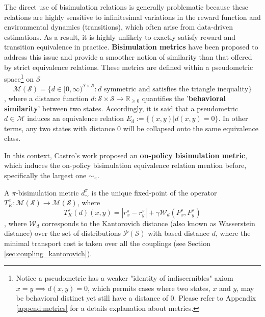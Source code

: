 The direct use of bisimulation relations is generally problematic because these relations are highly sensitive to infinitesimal variations in the reward function and environmental dynamics (transitions), which often arise from data-driven estimations. As a result, it is highly unlikely to exactly satisfy reward and transition equivalence in practice. \textbf{Bisimulation metrics} \cite{ferns2004metrics, ferns2011bisimulation, ferns2014bisimulation, castro2020scalable} have been proposed to address this issue and provide a smoother notion of similarity than that offered by strict equivalence relations. These metrics are defined within a pseudometric space\footnote{Notice a pseudometric has a weaker "identity of indiscernibles" axiom $x = y \implies d(x,y) = 0$, which permits cases where two states, $x$ and $y$, may be behavioral distinct yet still have a distance of 0. Please refer to Appendix \ref{append:metrics} for a details explanation about metrics.} on $\mathcal{S}$ 
\begin{equation}
\mathcal{M(S)}= \{d \in [0, \infty)^{\mathcal{S} \times \mathcal{S}} : d \text{ symmetric and satisfies the triangle inequality}\}
\end{equation}
, where a distance function \(d : \mathcal{S} \times \mathcal{S} \rightarrow \mathbb{R}_{\geq 0}\) quantifies the '\textbf{behavioral similarity}' between two states. Accordingly, it is said that a pseudometric $d \in \mathcal{M}$ induces an equivalence relation $E_d := \{(x, y)|d(x, y) = 0\}$. In other terms, any two states with distance 0 will be collapsed onto the same equivalence class.

In this context, Castro's work \cite{castro2020scalable} proposed an \textbf{on-policy bisimulation metric}, which induces the on-policy bisimulation equivalence relation mention before, specifically the largest one $\sim_\pi$.

\begin{definition}
\label{def:on_policy_bisimulation_metric}
A $\pi$-bisimulation metric $d^\pi_\sim$ is the unique fixed-point of the operator $T^\pi_K : \mathcal{M(S)} \rightarrow \mathcal{M(S)}$, where 
\begin{equation}
    \label{eq:on_policy_bisim_metric}
    T^\pi_K(d)(x, y) = |r^\pi_x - r^\pi_y| + \gamma \mathcal{W}_d(P^\pi_x,P^\pi_y) 
\end{equation}
, where $\mathcal{W}_d$ corresponds to the Kantorovich distance (also known as Wasserstein distance) over the set of distributions $\mathcal{P}(\mathcal{S})$ with based distance $d$, where the minimal transport cost is taken over all the couplings (see Section \ref{sec:coupling_kantorovich}).
\end{definition}

